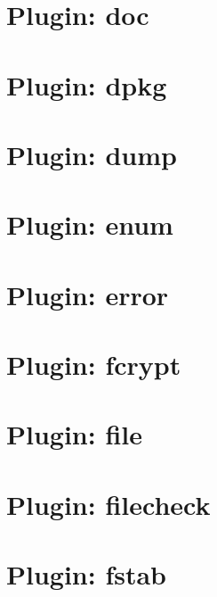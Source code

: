 \documentclass[twoside]{book}
\newcommand{\+}{\discretionary{\mbox{\scriptsize$\hookleftarrow$}}{}{}}
\begin{document}
\chapter{Plugin\+: doc}
\label{md_src_plugins_doc_README}

\chapter{Plugin\+: dpkg}
\label{md_src_plugins_dpkg_README}

\chapter{Plugin\+: dump}
\label{md_src_plugins_dump_README}

\chapter{Plugin\+: enum}
\label{md_src_plugins_enum_README}

\chapter{Plugin\+: error}
\label{md_src_plugins_error_README}

\chapter{Plugin\+: fcrypt}
\label{md_src_plugins_fcrypt_README}

\chapter{Plugin\+: file}
\label{md_src_plugins_file_README}

\chapter{Plugin\+: filecheck}
\label{md_src_plugins_filecheck_README}

\chapter{Plugin\+: fstab}
\label{md_src_plugins_fstab_README}

\end{document}
